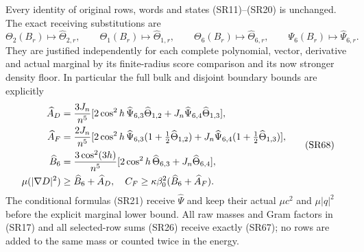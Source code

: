 \documentclass[11pt]{article}
\begin{document}
Every identity of original rows, words and states (SR11)–(SR20) is unchanged. The exact receiving substitutions are
\[
\Theta_2(B_r)\mapsto\widehat\Theta_{2,r},\qquad
\Theta_1(B_r)\mapsto\widehat\Theta_{1,r},\qquad
\Theta_6(B_r)\mapsto\widehat\Theta_{6,r},\qquad
\Psi_6(B_r)\mapsto\widehat\Psi_{6,r}.
\tag{SR67}
\]
They are justified independently for each complete polynomial, vector, derivative and actual marginal by its finite-radius score comparison and its now stronger density floor. In particular the full bulk and disjoint boundary bounds are explicitly
\[
\begin{aligned}
\widehat A_D&={3J_n\over n^5}[2\cos^2h\,\widehat\Psi_{6,3}\widehat\Theta_{1,2}
+J_n\widehat\Psi_{6,4}\widehat\Theta_{1,3}],\\
\widehat A_F&={2J_n\over n^5}[2\cos^2h\,\widehat\Psi_{6,3}(1+\tfrac12\widehat\Theta_{1,2})
+J_n\widehat\Psi_{6,4}(1+\tfrac12\widehat\Theta_{1,3})],\\
\widehat B_6&={3\cos^2(3h)\over n^5}[2\cos^2h\,\widehat\Theta_{6,3}+J_n\widehat\Theta_{6,4}],\\
\mu(|\nabla D|^2)&\ge\widehat B_6+\widehat A_D,\quad
C_F\ge\kappa\beta_0^2(\widehat B_6+\widehat A_F).
\end{aligned}\tag{SR68}
\]
The conditional formulas (SR21) receive \(\widehat\Psi\) and keep their actual \(\mu c^2\) and \(\mu|q|^2\) before the explicit marginal lower bound. All raw masses and Gram factors in (SR17) and all selected-row sums (SR26) receive exactly (SR67); no rows are added to the same mass or counted twice in the energy.
\end{document}
